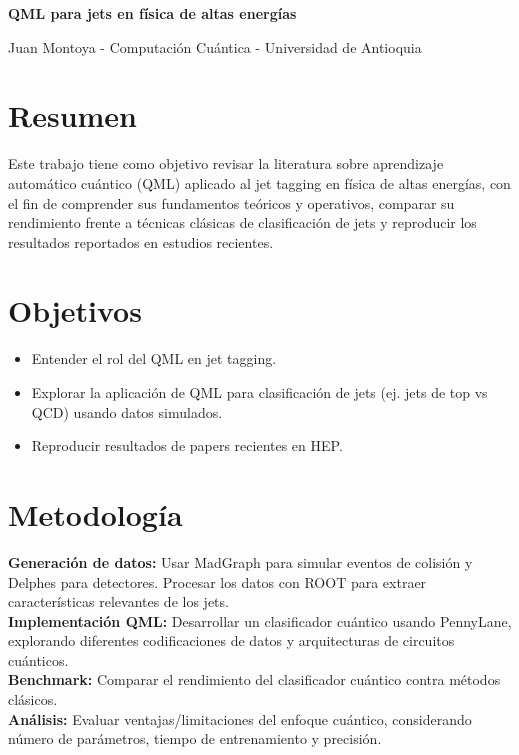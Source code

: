 \documentclass[12pt,a4paper]{article}
\begin{document}
\begin{center}
    {\Large\bfseries QML para jets en física de altas energías\par}
    \vspace{0.3cm}
    {\normalsize Juan Montoya - Computación Cuántica - Universidad de Antioquia\par}
    \vspace{0.2cm}
\end{center}

\section{Resumen}
Este trabajo tiene como objetivo revisar la literatura sobre aprendizaje automático cuántico (QML) aplicado al jet tagging en física de altas energías, con el fin de comprender sus fundamentos teóricos y operativos, comparar su rendimiento frente a técnicas clásicas de clasificación de jets y reproducir los resultados reportados en estudios recientes.

\section{Objetivos}
\begin{itemize}
    \item Entender el rol del QML en jet tagging.
    \item Explorar la aplicación de QML para clasificación de jets (ej. jets de top vs QCD) usando datos simulados.
    \item Reproducir resultados de papers recientes en HEP.
\end{itemize}

\section{Metodología}
\noindent\textbf{Generación de datos:} Usar MadGraph para simular eventos de colisión y Delphes para detectores. Procesar los datos con ROOT para extraer características relevantes de los jets.
\\
\noindent\textbf{Implementación QML:} Desarrollar un clasificador cuántico usando PennyLane, explorando diferentes codificaciones de datos y arquitecturas de circuitos cuánticos.
\\
\noindent\textbf{Benchmark:} Comparar el rendimiento del clasificador cuántico contra métodos clásicos.
\\
\noindent\textbf{Análisis:} Evaluar ventajas/limitaciones del enfoque cuántico, considerando número de parámetros, tiempo de entrenamiento y precisión.
\end{document}
